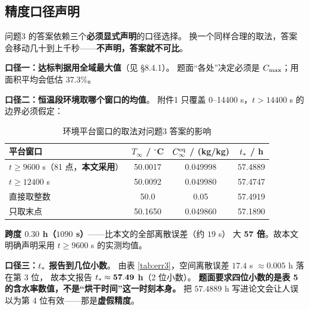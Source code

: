 \subsection{精度口径声明}
\label{sec:tstar-precision}

问题3 的答案依赖三个\textbf{必须显式声明}的口径选择。
换一个同样合理的取法，答案会移动几十到上千秒——\textbf{不声明，答案就不可比}。

\textbf{口径一：达标判据用全域最大值}（见 \S8.4.1）。
题面``各处''决定必须是 $C_{\max}$；用面积平均会低估 $37.3\%$。

\textbf{口径二：恒温段环境取哪个窗口的均值}。
附件1 只覆盖 0--14400 s，$t>14400$ s 的边界必须假定：

\begin{table}[H]
  \centering
  \caption{环境平台窗口的取法对问题3 答案的影响}
  \label{tab:window}
  \footnotesize
  \begin{tabular}{@{}lccc@{}}
    \toprule
    平台窗口 & $T_\infty$ / $^\circ$C & $C_\infty^{\mathrm{eq}}$ / (kg/kg) & $t_{*}$ / h \\
    \midrule
    $t\ge9600$ s（81 点，\textbf{本文采用}） & 50.0017 & 0.049998 & $\mathbf{57.4889}$ \\
    $t\ge12400$ s & 50.0092 & 0.049980 & 57.4747 \\
    直接取整数 & 50.0 & 0.05 & 57.4919 \\
    只取末点 & 50.1650 & 0.049860 & 57.1890 \\
    \bottomrule
  \end{tabular}
\end{table}

\textbf{跨度 $0.30$ h（$1090$ s）}——比本文的全部离散误差（约 $19$ s）
大 \textbf{57 倍}。故本文明确声明采用 $t\ge9600$ s 的实测均值。

\textbf{口径三：$t_{*}$ 报告到几位小数}。
由表 \ref{tab:err3}，空间离散误差 $17.4$ s $\approx0.005$ h 落在第 3 位，
故本文报告 $t_{*}\approx\mathbf{57.49}$ \textbf{h}（2 位小数）。
\textbf{题面要求四位小数的是表 5 的含水率数值，不是``烘干时间''这一时刻本身。}
把 $57.4889$ h 写进论文会让人误以为第 4 位有效——那是\textbf{虚假精度}。
